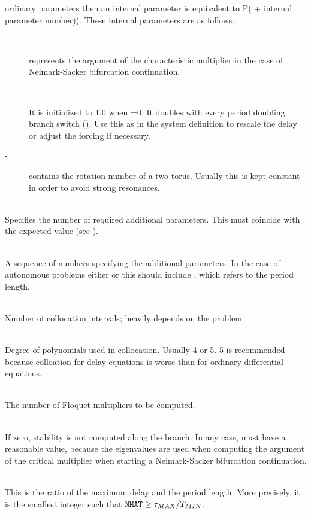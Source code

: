 \documentclass[10pt,a4paper]{ddedoc}
\begin{document}
\begin{description}
ordinary parameters then an internal parameter is equivalent to P( +
internal parameter number)). 
These  internal parameters are as follows.
\begin{description}
\item[ -] represents the argument of the characteristic multiplier in the case of
Neimark-Sacker bifurcation continuation.
\item[ -] It is initialized to 1.0 when =0. It doubles with
every period doubling branch switch (). Use this as  in the
system definition to rescale the delay or adjust the forcing if necessary.
\item[ -] contains the rotation number of a two-torus. Usually this is kept
constant in order to avoid strong resonances.
\end{description}
%
\item[\funp{NPARX}] ~\\
Specifies the number of required additional parameters. This must coincide with
the expected value (see ).
%
\item[\funp{PARX}] ~\\
A sequence of numbers specifying the additional parameters. In
the case of autonomous problems either  or this should include
, which refers to the period length.
%
\item[\funp{NINT}] ~\\
Number of collocation intervals; heavily depends on the problem.
%
\item[\funp{NDEG}] ~\\
Degree of polynomials used in collocation. Usually 4 or 5. 
5 is recommended because colloation for delay equations is worse than for ordinary differential equations.
%
\item[\funp{NMUL}] ~\\
The number of Floquet multipliers to be computed.
%
\item[\funp{STAB}] ~\\
If zero, stability is not computed along the branch. In any case, 
must have a reasonable value, because the eigenvalues are used when computing
the argument of the critical multiplier when starting a Neimark-Sacker
bifurcation continuation.
%
\item[\funp{NMAT}] ~\\
This is the ratio of the maximum delay and the period length. More precisely, it
is the smallest integer such that ${\tt NMAT} \ge \tau_{MAX}/T_{MIN}$.

\end{description}
\end{document}
